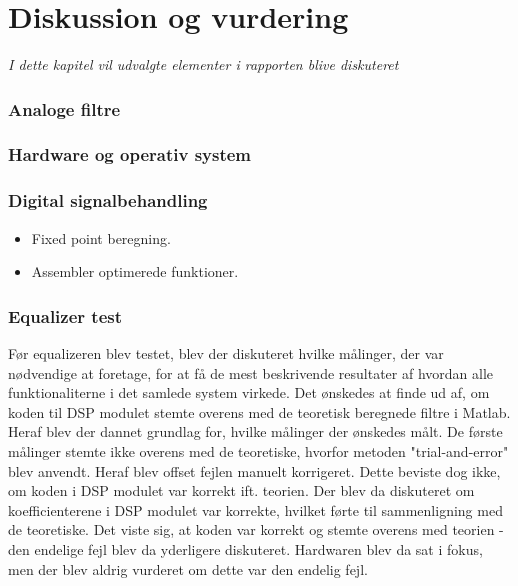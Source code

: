 
\chapter{Diskussion og vurdering}\label{kap:diskussion}
\emph{I dette kapitel vil udvalgte elementer i rapporten blive diskuteret}

\subsection{Analoge filtre}

\subsection{Hardware og operativ system}

\subsection{Digital signalbehandling}

\begin{itemize}
\item Fixed point beregning.
\item Assembler optimerede funktioner.
\end{itemize}
\subsection{Equalizer test}

Før equalizeren blev testet, blev der diskuteret hvilke målinger, der var nødvendige at foretage, for at få de mest beskrivende resultater af hvordan alle funktionaliterne i det samlede system virkede.
Det ønskedes at finde ud af, om koden til DSP modulet stemte overens med de teoretisk beregnede filtre i Matlab. 
Heraf blev der dannet grundlag for, hvilke målinger der ønskedes målt.
De første målinger stemte ikke overens med de teoretiske, hvorfor metoden "trial-and-error" blev anvendt. 
Heraf blev offset fejlen manuelt korrigeret.
Dette beviste dog ikke, om koden i DSP modulet var korrekt ift. teorien.
Der blev da diskuteret om koefficienterene i DSP modulet var korrekte, hvilket førte til sammenligning med de teoretiske.
Det viste sig, at koden var korrekt og stemte overens med teorien - den endelige fejl blev da yderligere diskuteret.
Hardwaren blev da sat i fokus, men der blev aldrig vurderet om dette var den endelig fejl.





 


